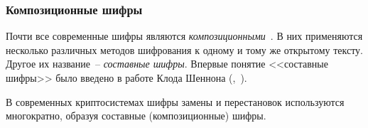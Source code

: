 \subsubsection{Композиционные шифры}

Почти все современные шифры являются \emph{композиционными}~\cite{AlZKCh:2001}. В них применяются несколько различных методов шифрования к одному и тому же открытому тексту. Другое их название~-- \emph{составные шифры}. Впервые понятие <<составные шифры>> было введено в работе Клода Шеннона (,~\cite{Shannon:1949:CTS}).

В современных криптосистемах шифры замены и перестановок используются многократно, образуя составные (композиционные) шифры.
